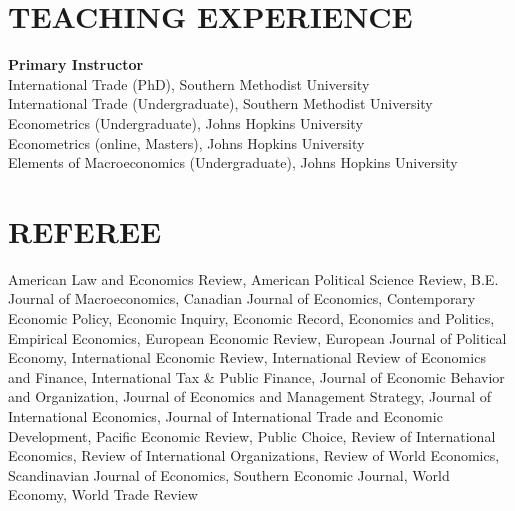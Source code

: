 \documentclass[11pt]{res}
\begin{document}
\begin{resume}
\section{TEACHING EXPERIENCE} \vspace{1.5mm}
{\bf Primary Instructor}\vspace{1.5mm}\\
International Trade (PhD), Southern Methodist University\vspace{1.5mm}\\
International Trade (Undergraduate), Southern Methodist University\vspace{1.5mm}\\
Econometrics (Undergraduate), Johns Hopkins University\vspace{1.5mm}\\
Econometrics (online, Masters), Johns Hopkins University\vspace{1.5mm}\\
Elements of Macroeconomics (Undergraduate), Johns Hopkins University

\section{REFEREE} \vspace{1.5mm}
American Law and Economics Review, American Political Science Review, B.E. Journal of Macroeconomics, Canadian Journal of Economics, Contemporary Economic Policy, Economic Inquiry, Economic Record, 
Economics and Politics, Empirical Economics, European Economic Review, European Journal of Political Economy, International Economic Review, International Review of Economics and Finance, International Tax \& Public Finance,
Journal of Economic Behavior and Organization, Journal of Economics and Management Strategy, Journal of International Economics, Journal of International Trade and Economic Development, Pacific Economic Review,
Public Choice, Review of International Economics, Review of International Organizations, Review of World Economics, Scandinavian Journal of Economics, Southern Economic Journal, World Economy, World Trade Review
\end{resume}
\end{document}

